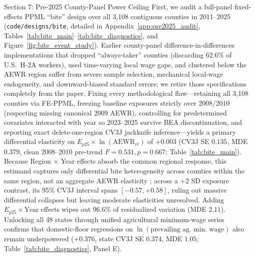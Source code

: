\begin{llmdraft}{Section 7: Pre-2025 County-Panel Power Ceiling}
First, we audit a full-panel fixed-effects PPML ``bite'' design over all 3,108
contiguous counties in 2011--2025 (\texttt{code/designs/bite}, detailed in
Appendix~\ref{app:pre2025_audit}, Tables~\ref{tab:bite_main}--\ref{tab:bite_diagnostics},
and Figure~\ref{fig:bite_event_study}). Earlier county-panel difference-in-differences
implementations that dropped ``always-taker'' counties (discarding 62.6\% of
U.S.\ H-2A workers), used time-varying local wage gaps, and clustered below the
AEWR region suffer from severe sample selection, mechanical local-wage
endogeneity, and downward-biased standard errors; we retire those specifications
completely from the paper. Fixing every methodological flaw---retaining all
3,108 counties via FE-PPML, freezing baseline exposures strictly over 2008/2010
(respecting missing canonical 2009 AEWR), controlling for predetermined
covariates interacted with year so 2023--2025 survive BEA discontinuation, and
reporting exact delete-one-region CV3J jackknife inference---yields a primary
differential elasticity on $E_{p25} \times \ln(\text{AEWR}_{rt})$ of $+0.003$
(CV3J SE $0.135$, MDE $0.379$, clean 2008--2010 pre-trend $F=0.531, p=0.667$;
Table~\ref{tab:bite_main}). Because Region $\times$ Year effects absorb the
common regional response, this estimand captures only differential bite
heterogeneity across counties within the same region, not an aggregate AEWR
elasticity \citep{callaway_goodman_bacon_santanna_2024}; across a $+2$ SD
exposure contrast, its 95\% CV3J interval spans $[-0.57, +0.58]$, ruling out
massive differential collapses but leaving moderate elasticities unresolved.
Adding $E_{p25} \times \text{Year}$ effects wipes out 96.6\% of residualized
variation (MDE $2.11$). Unlocking all 48 states through unified agricultural
minimum-wage series confirms that domestic-floor regressions on
$\ln(\text{prevailing ag.\ min.\ wage})$ also remain underpowered ($+0.376$,
state CV3J SE $0.374$, MDE $1.05$; Table~\ref{tab:bite_diagnostics}, Panel E).


\end{llmdraft}
